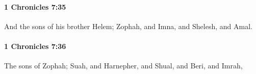 		\paragraph{1 Chronicles 7:35} %
			\label{1CHRONICLES-7-35}

			And the sons of his brother Helem; Zophah, and Imna, and Shelesh, and Amal.


		\paragraph{1 Chronicles 7:36} %
			\label{1CHRONICLES-7-36}

			The sons of Zophah; Suah, and Harnepher, and Shual, and Beri, and Imrah,


